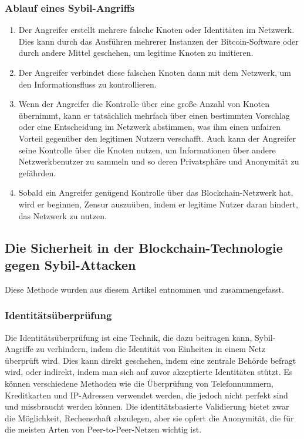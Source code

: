 \subsubsection{Ablauf eines Sybil-Angriffs}
\begin{enumerate}
	\item Der Angreifer erstellt mehrere falsche Knoten oder Identitäten im Netzwerk. Dies kann durch das Ausführen mehrerer Instanzen der Bitcoin-Software oder durch andere Mittel geschehen, um legitime Knoten zu imitieren.
	
	\item Der Angreifer verbindet diese falschen Knoten dann mit dem Netzwerk, um den Informationsfluss zu kontrollieren.
	
	\item Wenn der Angreifer die Kontrolle über eine große Anzahl von Knoten übernimmt, kann er tatsächlich mehrfach über einen bestimmten Vorschlag oder eine Entscheidung im Netzwerk abstimmen, was ihm einen unfairen Vorteil gegenüber den legitimen Nutzern verschafft. Auch kann der Angreifer seine Kontrolle über die Knoten nutzen, um Informationen über andere Netzwerkbenutzer zu sammeln und so deren Privatsphäre und Anonymität zu gefährden.
	
	\item Sobald ein Angreifer genügend Kontrolle über das Blockchain-Netzwerk hat, wird er beginnen, Zensur auszuüben, indem er legitime Nutzer daran hindert, das Netzwerk zu nutzen.
	
\end{enumerate}

\subsection{Die Sicherheit in der Blockchain-Technologie gegen Sybil-Attacken}
Diese Methode wurden aus diesem Artikel \cite{sybil_attack} entnommen und zusammengefasst.
\subsubsection{Identitätsüberprüfung}
Die Identitätsüberprüfung ist eine Technik, die dazu beitragen kann, Sybil-Angriffe zu verhindern, indem die Identität von Einheiten in einem Netz überprüft wird. Dies kann direkt geschehen, indem eine zentrale Behörde befragt wird, oder indirekt, indem man sich auf zuvor akzeptierte Identitäten stützt. Es können verschiedene Methoden wie die Überprüfung von Telefonnummern, Kreditkarten und IP-Adressen verwendet werden, die jedoch nicht perfekt sind und missbraucht werden können. Die identitätsbasierte Validierung bietet zwar die Möglichkeit, Rechenschaft abzulegen, aber sie opfert die Anonymität, die für die meisten Arten von Peer-to-Peer-Netzen wichtig ist.
